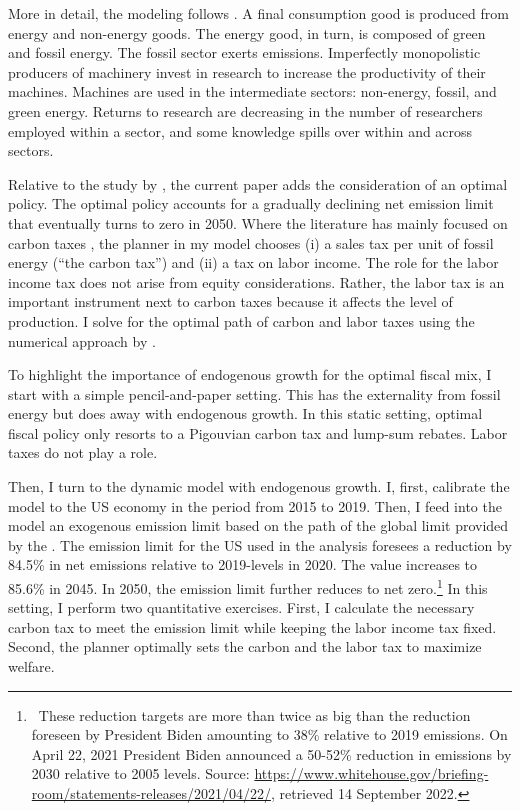 More in detail, the modeling follows \cite{Fried2018ClimateAnalysis}. A final consumption good is produced from energy and non-energy goods. The energy good, in turn, is composed of green and fossil energy. The fossil sector exerts emissions. Imperfectly monopolistic producers of machinery invest in research to increase the productivity of their machines. Machines are used in the intermediate sectors: non-energy, fossil, and green energy. Returns to research are decreasing in the number of researchers employed within a sector, and some knowledge spills over within and across sectors.

Relative to the study by \cite{Fried2018ClimateAnalysis}, the current paper adds the consideration of an optimal policy. The optimal policy accounts for a gradually declining  net emission limit that eventually turns to zero in 2050. Where the literature  has mainly focused on carbon taxes \citep{Acemoglu2012TheChange, Fried2018ClimateAnalysis}, the planner in my model chooses (i) a sales tax per unit of fossil energy (“the carbon tax”) and (ii) a tax on labor income. The role for the labor income tax does not arise from equity considerations. Rather, the labor tax is an important instrument next to carbon taxes because it affects the level of production.  I solve for the optimal path of carbon and labor taxes using the numerical approach by  \citep{Jones1993OptimalGrowth, Barrage2019OptimalPolicy}.

To highlight the importance of endogenous growth for the optimal fiscal mix, I start with a simple pencil-and-paper setting. This has the externality from fossil energy but does away with endogenous growth. In this static setting, optimal fiscal policy only resorts to a Pigouvian carbon tax and lump-sum rebates. Labor taxes do not play a role.

Then, I turn to the dynamic model with endogenous growth. I, first, calibrate the model to the US economy in the period from 2015 to 2019. Then, I feed into the model an exogenous emission limit based on the path of the global limit provided by the \cite{IPCC2022}. The emission limit for the US used in the analysis foresees a reduction by 84.5\% in net emissions relative to 2019-levels in 2020. The value increases to 85.6\% in 2045. In 2050, the emission limit further reduces to net zero.\footnote{\  These reduction targets are more than twice as big than the reduction foreseen by President Biden amounting to 38\% relative to 2019 emissions. On April 22, 2021 President Biden announced a 50-52\% reduction in emissions by 2030 relative to 2005 levels. Source:  \href{https://www.whitehouse.gov/briefing-room/statements-releases/2021/04/22/fact-sheet-president-biden-sets-2030-greenhouse-gas-pollution-reduction-target-aimed-at-creating-good-paying-union-jobs-and-securing-u-s-leadership-on-clean-energy-technologies/}{https://www.whitehouse.gov/briefing-room/statements-releases/2021/04/22/}, retrieved 14 September 2022.}
 In this setting, I perform two quantitative exercises. First, I calculate the necessary carbon tax to meet the emission limit while keeping the labor income tax fixed. Second,  the planner optimally sets the carbon and the labor tax to maximize welfare.


